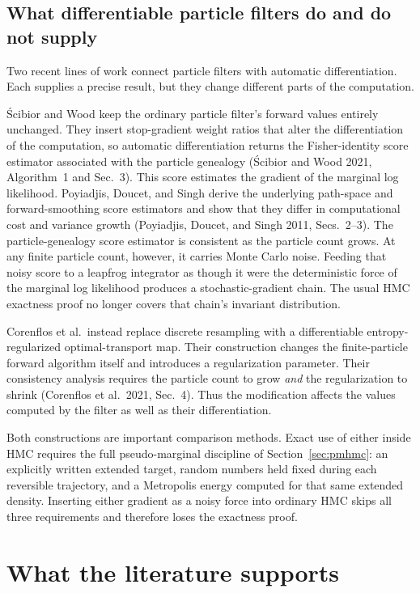 \documentclass[11pt]{article}
\begin{document}
\subsection{What differentiable particle filters do and do not supply}\label{sec:dpf}

Two recent lines of work connect particle filters with automatic differentiation. Each supplies a precise result, but they change different parts of the computation.

\'Scibior and Wood keep the ordinary particle filter's forward values entirely unchanged. They insert stop-gradient weight ratios that alter the differentiation of the computation, so automatic differentiation returns the Fisher-identity score estimator associated with the particle genealogy (\'Scibior and Wood 2021,
Algorithm~1 and Sec.~3). This score estimates the gradient of the marginal log likelihood. Poyiadjis, Doucet, and Singh derive the underlying path-space and forward-smoothing score estimators and show that they differ in computational cost and variance growth (Poyiadjis, Doucet, and Singh 2011, Secs.~2--3). The particle-genealogy score estimator is consistent as the particle count grows. At any finite particle count, however, it carries Monte Carlo noise. Feeding that noisy score to a leapfrog integrator as though it were the deterministic force of the marginal log likelihood produces a stochastic-gradient chain. The usual HMC exactness proof no longer covers that chain's invariant distribution.

Corenflos et al.\ instead replace discrete resampling with a differentiable entropy-regularized optimal-transport map. Their construction changes the finite-particle forward algorithm itself and introduces a regularization parameter. Their consistency analysis requires the particle count to grow \emph{and} the regularization to shrink (Corenflos et al.\ 2021, Sec.~4). Thus the modification affects the values computed by the filter as well as their differentiation.

Both constructions are important comparison methods. Exact use of either inside HMC requires the full pseudo-marginal discipline of Section~\ref{sec:pmhmc}: an explicitly written extended target, random numbers held fixed during each reversible trajectory, and a Metropolis energy computed for that same extended density. Inserting either gradient as a noisy force into ordinary HMC skips all three requirements and therefore loses the exactness proof.

\section{What the literature supports}\label{sec:synthesis}
\end{document}
